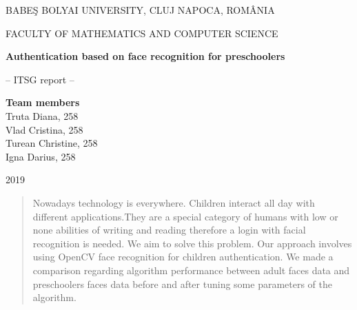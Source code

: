 \documentclass[runningheads,a4paper,11pt]{report}
\begin{document}
    \begin{titlepage}
        \sloppy
        \begin{center}
            BABE\c S BOLYAI UNIVERSITY, CLUJ NAPOCA, ROM\^ ANIA

            FACULTY OF MATHEMATICS AND COMPUTER SCIENCE

            \vspace{6cm}

            \Huge \textbf{Authentication based on face recognition for preschoolers}

            \vspace{1cm}

            \normalsize -- ITSG report --

        \end{center}


        \vspace{5cm}

        \begin{flushright}
            \Large{\textbf{Team members}}\\
            Truta Diana, 258 \\
            Vlad Cristina, 258 \\
            Turean Christine, 258 \\
            Igna Darius, 258 \\

        \end{flushright}

        \vspace{4cm}

        \begin{center}
            2019
        \end{center}

    \end{titlepage}


    \begin{abstract}
        Nowadays technology is everywhere. Children interact all day with different applications.They are a special category of humans with low or none abilities of writing and reading therefore a login with facial recognition is needed. We aim to solve this problem. Our approach involves using OpenCV face recognition for children authentication. We made a comparison regarding algorithm performance between adult faces data and preschoolers faces data before and after tuning some parameters of the algorithm.
    \end{abstract}
\end{document}

